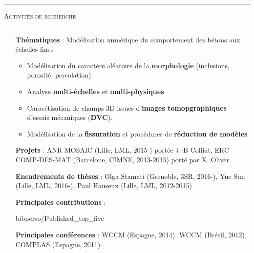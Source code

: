 \documentclass[a4paper,11pt]{article}
\newcommand{\titre}[1]{
  \begin{center}
    \rule{0.4\textwidth}{0.5pt}
    \par\vspace{0.1cm}
    \textsc{\large #1}
    \par\vspace{-0.2cm}
    \par\noindent\rule{0.4\textwidth}{0.5pt}
  \end{center}
}
\begin{document}
\titre{Activités de recherche}
\begin{itemize}
  \item[\textbf{Thématiques}] : Modélisation numérique du comportement des bétons aux échelles fines
    \begin{itemize}
    \item Modélisation du caractère aléatoire de la \textbf{morphologie} (inclusions, porosité, percolation)
    \item Analyse \textbf{multi-échelles} et \textbf{multi-physiques}
    \item Caracétisation de champs 3D issues d'{\bf images tomopgraphiques} d'essais mécaniques ({\bf DVC}).
    \item Modélisation de la \textbf{fissuration} et procédures de \textbf{réduction de modèles}
    \end{itemize}
  \item[\textbf{Projets}] : ANR MOSAIC (Lille, LML, 2015-) portée J.-B Colliat, ERC COMP-DES-MAT (Barcelone, CIMNE, 2013-2015) porté par X. Oliver.
  \item[\textbf{Encadrements de thèses}] : Olga Stamati (Grenoble, 3SR, 2016-), Yue Sun (Lille, LML, 2016-), Paul Hauseux (Lille, LML, 2012-2015)
  \item[\textbf{Principales contributions}] :
    \NoAutoSpaceBeforeFDP
    \begin{btSect}{bibperso/Published_top_five}
      \btPrintAll
    \end{btSect}
    \AutoSpaceBeforeFDP
  \item[\textbf{Principales conférences}] : WCCM (Espagne, 2014), WCCM (Brésil, 2012), COMPLAS (Espagne, 2011)
\end{itemize}
\vfill
\end{document}
